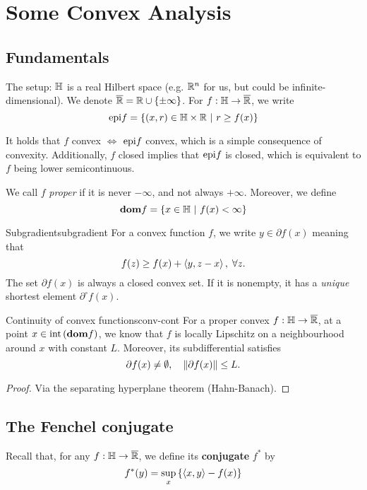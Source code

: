 \section{Some Convex Analysis}

\subsection{Fundamentals}
The setup: $\mathbb{H}$ is a real Hilbert space (e.g. $\mathbb{R}^n$ for us, but could be
infinite-dimensional).
We denote $\overline{\mathbb{R}} = \mathbb{R} \cup \left\{ \pm \infty \right\}$. For $f: \mathbb{H} \to
\overline{\mathbb{R}}$, we write
\begin{equation}
    \mathrm{epi} f = \left\{ (x, r) \in \mathbb{H} \times \mathbb{R} \ \middle| \  r \geq f(x) \right\}
    \label{eq:epif}
\end{equation}

It holds that $f$ convex $\Leftrightarrow$ $\mathrm{epi} f$ convex, which is a simple
consequence of convexity. Additionally, $f$ closed implies that $\mathrm{epi} f$ is
closed, which is equivalent to $f$ being lower semicontinuous.

We call $f$ \textit{proper} if it is never $-\infty$, and not always $+\infty$.
Moreover, we define
\begin{equation}
    \textbf{dom} f = \left\{ x \in \mathbb{H} \ \middle| \  f(x) < \infty \right\} \label{eq:domf}
\end{equation}

\begin{cdefinition}{Subgradient}{subgradient}
    For a convex function $f$, we write $y \in \partial f(x)$ meaning that
    \[
        f(z) \geq f(x) + \left\langle y, z - x \right\rangle, \; \forall z.
    \]
    The set $\partial f(x)$ is always a closed convex set. If it is nonempty,
    it has a \textit{unique} shortest element $\partial^{\circ} f(x)$.
\end{cdefinition}


\begin{ctheorem}{Continuity of convex functions}{conv-cont}
    For a proper convex $f: \mathbb{H} \to \overline{\mathbb{R}}$, at a point $x \in
    \mathrm{int}\left( \textbf{dom} f \right)$, we know that $f$ is locally Lipschitz on a neighbourhood
    around $x$ with constant $L$. Moreover, its subdifferential satisfies
    \[
        \partial f(x) \neq \emptyset, \quad \left \| \partial f(x) \right \| \leq L.
    \]
\end{ctheorem}
\begin{proof}
    Via the separating hyperplane theorem (Hahn-Banach).
\end{proof}

\subsection{The Fenchel conjugate}
Recall that, for any $f: \mathbb{H} \to \overline{\mathbb{R}}$, we define its
\textbf{conjugate} $f^*$ by
\begin{equation}
    f^*(y) = \sup_{x} \left\{ \left\langle x, y \right\rangle - f(x) \right\}
    \label{eq:fenchel_conjugate}
\end{equation}


